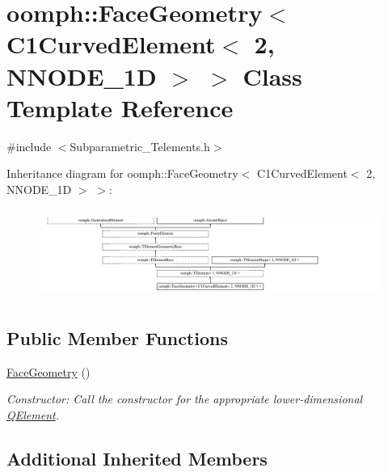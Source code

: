 \hypertarget{classoomph_1_1FaceGeometry_3_01C1CurvedElement_3_012_00_01NNODE__1D_01_4_01_4}{}\section{oomph\+:\+:Face\+Geometry$<$ C1\+Curved\+Element$<$ 2, N\+N\+O\+D\+E\+\_\+1D $>$ $>$ Class Template Reference}
\label{classoomph_1_1FaceGeometry_3_01C1CurvedElement_3_012_00_01NNODE__1D_01_4_01_4}


{\ttfamily \#include $<$Subparametric\+\_\+\+Telements.\+h$>$}

Inheritance diagram for oomph\+:\+:Face\+Geometry$<$ C1\+Curved\+Element$<$ 2, N\+N\+O\+D\+E\+\_\+1D $>$ $>$\+:\begin{figure}[H]
\begin{center}
\leavevmode
\includegraphics[height=2.947368cm]{classoomph_1_1FaceGeometry_3_01C1CurvedElement_3_012_00_01NNODE__1D_01_4_01_4}
\end{center}
\end{figure}
\subsection*{Public Member Functions}
\begin{DoxyCompactItemize}
\item 
\hyperlink{classoomph_1_1FaceGeometry_3_01C1CurvedElement_3_012_00_01NNODE__1D_01_4_01_4_a72bc38ac6bbdedd73cb1956781f9d49d}{Face\+Geometry} ()
\begin{DoxyCompactList}\small\item\em Constructor\+: Call the constructor for the appropriate lower-\/dimensional \hyperlink{classoomph_1_1QElement}{Q\+Element}. \end{DoxyCompactList}\end{DoxyCompactItemize}
\subsection*{Additional Inherited Members}


